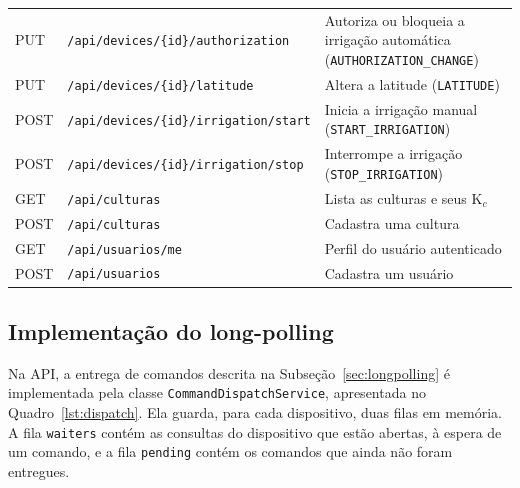 {\begin{longtable}{>{\raggedright\arraybackslash}p{1.4cm}
                  >{\raggedright\arraybackslash}p{7.3cm}
                  >{\raggedright\arraybackslash}p{5.9cm}}
  PUT & \texttt{/api/devices/\{id\}/authorization} & Autoriza ou bloqueia a irrigação automática (\texttt{AUTHORIZATION\_CHANGE}) \\
  PUT & \texttt{/api/devices/\{id\}/latitude} & Altera a latitude (\texttt{LATITUDE}) \\
  POST & \texttt{/api/devices/\{id\}/irrigation/start} & Inicia a irrigação manual (\texttt{START\_IRRIGATION}) \\
  POST & \texttt{/api/devices/\{id\}/irrigation/stop} & Interrompe a irrigação (\texttt{STOP\_IRRIGATION}) \\
  GET & \texttt{/api/culturas} & Lista as culturas e seus K$_c$ \\
  POST & \texttt{/api/culturas} & Cadastra uma cultura \\
  GET & \texttt{/api/usuarios/me} & Perfil do usuário autenticado \\
  POST & \texttt{/api/usuarios} & Cadastra um usuário \\
\end{longtable}
}
\vspace{-0.8\baselineskip}

\subsection{Implementação do long-polling}
\label{subsec:dispatch}

Na API, a entrega de comandos descrita na Subseção~\ref{sec:longpolling} é implementada pela classe \texttt{CommandDispatchService}, apresentada no Quadro~\ref{lst:dispatch}. Ela guarda, para cada dispositivo, duas filas em memória. A fila \texttt{waiters} contém as consultas do dispositivo que estão abertas, à espera de um comando, e a fila \texttt{pending} contém os comandos que ainda não foram entregues.

